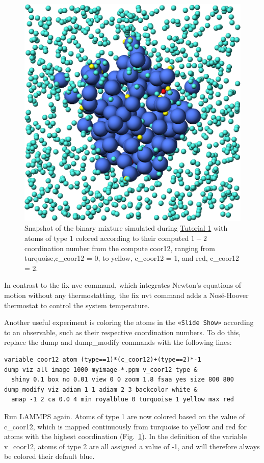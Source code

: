 \documentclass[9pt,tutorial]{livecoms}
\newcommand{\lmpcmd}[1]{\colorbox{listing}{\textcolor{command}{\small{#1}}}} %
\newcommand{\guicmd}[1]{\textcolor{command}{\texttt{«#1»}}} %
\begin{document}
\begin{figure}
\centering
\includegraphics[width=0.50\linewidth]{LJ-coords}
\caption{Snapshot of the binary mixture simulated
  during \hyperref[lennard-jones-label]{Tutorial 1} with atoms of type 1
  colored according to their computed $1-2$ coordination
  number from the compute \lmpcmd{coor12}, ranging from turquoise,\lmpcmd{c\_coor12 = 0},
  to yellow, \lmpcmd{c\_coor12 = 1}, and red, \lmpcmd{c\_coor12 = 2}.}
\label{fig:coords-viz}
\end{figure}

\begin{note}
  In contrast to the \lmpcmd{fix nve} command, which integrates Newton's equations
  of motion without any thermostatting, the \lmpcmd{fix nvt} command adds a Nosé-Hoover
  thermostat to control the system temperature.
\end{note}

Another useful experiment is coloring the atoms in the \guicmd{Slide Show}
according to an observable, such as their respective coordination
numbers.  To do this, replace the
\lmpcmd{dump} and \lmpcmd{dump\_modify} commands with the following lines:
\begin{lstlisting}
variable coor12 atom (type==1)*(c_coor12)+(type==2)*-1
dump viz all image 1000 myimage-*.ppm v_coor12 type &
  shiny 0.1 box no 0.01 view 0 0 zoom 1.8 fsaa yes size 800 800
dump_modify viz adiam 1 1 adiam 2 3 backcolor white &
  amap -1 2 ca 0.0 4 min royalblue 0 turquoise 1 yellow max red
\end{lstlisting}
Run LAMMPS again.  Atoms of type 1 are now colored based on the value
of \lmpcmd{c\_coor12}, which is mapped continuously from turquoise to yellow
and red for atoms with the highest coordination (Fig.~\ref{fig:coords-viz}).
In the definition of the variable \lmpcmd{v\_coor12}, atoms of type 2 are
all assigned a value of -1, and will therefore always be colored their default blue.
\end{document}

